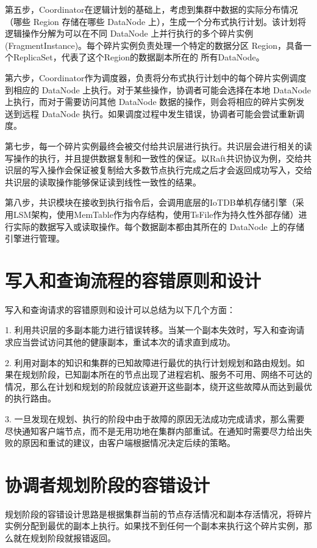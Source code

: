 第五步，Coordinator在逻辑计划的基础上，考虑到集群中数据的实际分布情况（哪些 Region 存储在哪些 DataNode 上），生成一个分布式执行计划。该计划将逻辑操作分解为可以在不同 DataNode 上并行执行的多个碎片实例 (FragmentInstance)。每个碎片实例负责处理一个特定的数据分区 Region，具备一个ReplicaSet，代表了这个Region的数据副本所在的 所有DataNode。

第六步，Coordinator作为调度器，负责将分布式执行计划中的每个碎片实例调度到相应的 DataNode 上执行。对于某些操作，协调者可能会选择在本地 DataNode 上执行，而对于需要访问其他 DataNode 数据的操作，则会将相应的碎片实例发送到远程 DataNode 执行。如果调度过程中发生错误，协调者可能会尝试重新调度。

第七步，每一个碎片实例最终会被交付给共识层进行执行。共识层会进行相关的读写操作的执行，并且提供数据复制和一致性的保证。以Raft共识协议为例，交给共识层的写入操作会保证被复制给大多数节点执行完成之后才会返回成功写入，交给共识层的读取操作能够保证读到线性一致性的结果。

第八步，共识模块在接收到执行指令后，会调用底层的IoTDB单机存储引擎（采用LSM架构，使用MemTable作为内存结构，使用TsFile\cite{zhao2024apachetsfile}作为持久性外部存储）进行实际的数据写入或读取操作。每个数据副本都由其所在的 DataNode 上的存储引擎进行管理。


\section{写入和查询流程的容错原则和设计}

写入和查询请求的容错原则和设计可以总结为以下几个方面：

1. 利用共识层的多副本能力进行错误转移。当某一个副本失效时，写入和查询请求应当尝试访问其他的健康副本，重试本次的请求直到成功。

2. 利用对副本的知识和集群的已知故障进行最优的执行计划规划和路由规划。如果在规划阶段，已知副本所在的节点出现了进程宕机、服务不可用、网络不可达的情况，那么在计划和规划的阶段就应该避开这些副本，绕开这些故障从而达到最优的执行路由。

3. 一旦发现在规划、执行的阶段中由于故障的原因无法成功完成请求，那么需要尽快通知客户端节点，而不是无用功地在集群内部重试。在通知时需要尽力给出失败的原因和重试的建议，由客户端根据情况决定后续的策略。


\section{协调者规划阶段的容错设计}

规划阶段的容错设计思路是根据集群当前的节点存活情况和副本存活情况，将碎片实例分配到最优的副本上执行。如果找不到任何一个副本来执行这个碎片实例，那么就在规划阶段就报错返回。


